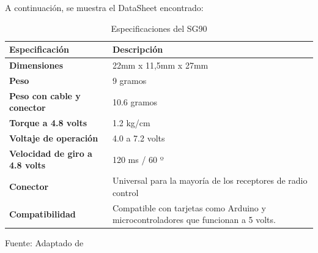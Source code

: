 A continuación, se muestra el DataSheet encontrado:

\begin{table}[H]
    \centering
    \begin{tabularx}{\textwidth}{|l|X|} %
        \hline
        \textbf{Especificación} & \textbf{Descripción} \\ 
        \hline
        \textbf{Dimensiones} & 22mm x 11,5mm x 27mm \\ 
        \hline
        \textbf{Peso} & 9 gramos \\ 
        \hline
        \textbf{Peso con cable y conector} & 10.6 gramos \\ 
        \hline
        \textbf{Torque a 4.8 volts} & 1.2 kg/cm \\ 
        \hline
        \textbf{Voltaje de operación} & 4.0 a 7.2 volts \\ 
        \hline
        \textbf{Velocidad de giro a 4.8 volts} & 120 ms / 60 º \\ 
        \hline
        \textbf{Conector} & Universal para la mayoría de los receptores de radio control \\ 
        \hline
        \textbf{Compatibilidad} & Compatible con tarjetas como Arduino y microcontroladores que funcionan a 5 volts. \\ 
        \hline
    \end{tabularx}
    \caption{Especificaciones del SG90}{Fuente: Adaptado de~\cite{servo_motor}}
    \label{tab:especificaciones_sg90}
\end{table}